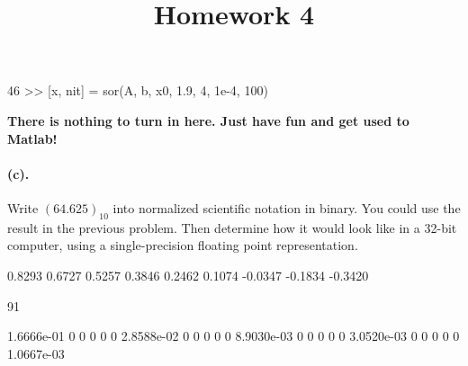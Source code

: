     46
    >> [x, nit] = sor(A, b, x0, 1.9, 4, 1e-4, 100)

\textbf{There is nothing to turn in here. Just have fun and get used to Matlab!}

\paragraph{(c).} Write $(64.625)_{10}$ into normalized scientific notation in binary. 
You could use the result in the previous problem. 
Then determine how it would look like in  a 32-bit computer,
using a single-precision floating point representation.

\title{ Homework 4}
\author{}

    0.8293
    0.6727
    0.5257
    0.3846
    0.2462
    0.1074
   -0.0347
   -0.1834
   -0.3420

    91

   1.6666e-01            0            0            0            0
            0   2.8588e-02            0            0            0
            0            0   8.9030e-03            0            0
            0            0            0   3.0520e-03            0
            0            0            0            0   1.0667e-03

\section*{}
\setcounter{section}{9}
